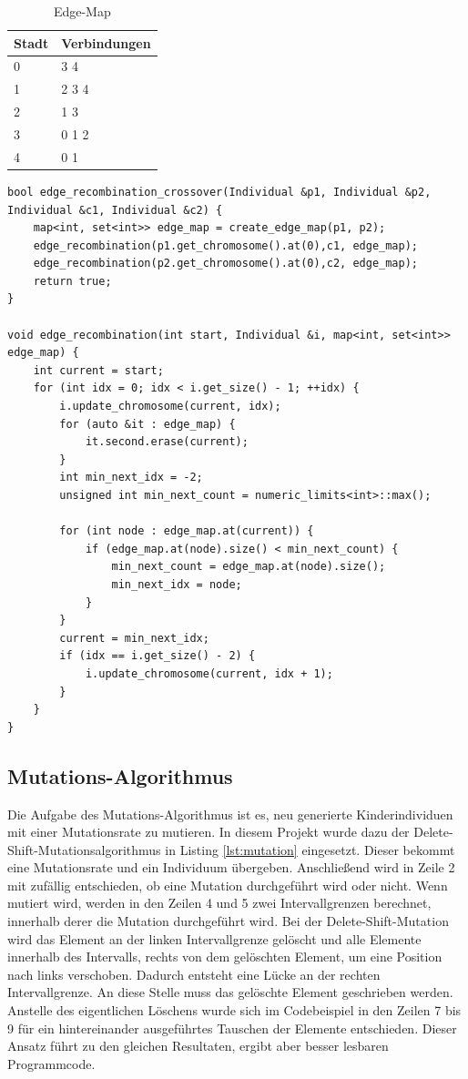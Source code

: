 \begin{table}[!htb]
\center
\caption{Edge-Map}
\begin{tabular}{l|l}
Stadt & Verbindungen \\
\hline
0 & 3 4\\
1 & 2 3 4\\
2 & 1 3\\
3 & 0 1 2\\
4 & 0 1\\
\end{tabular}
\label{tab:em}
\end{table}

\begin{minipage}[!htb]{\linewidth}
\begin{lstlisting}[caption={Edge-Recombination-Crossover}, firstnumber=1, captionpos=b, label=lst:erx]
bool edge_recombination_crossover(Individual &p1, Individual &p2, Individual &c1, Individual &c2) {
	map<int, set<int>> edge_map = create_edge_map(p1, p2);
	edge_recombination(p1.get_chromosome().at(0),c1, edge_map);
	edge_recombination(p2.get_chromosome().at(0),c2, edge_map);
	return true;
}

void edge_recombination(int start, Individual &i, map<int, set<int>> edge_map) {
	int current = start;
	for (int idx = 0; idx < i.get_size() - 1; ++idx) {
		i.update_chromosome(current, idx);
		for (auto &it : edge_map) {
			it.second.erase(current);
		}
		int min_next_idx = -2;
		unsigned int min_next_count = numeric_limits<int>::max();

		for (int node : edge_map.at(current)) {
			if (edge_map.at(node).size() < min_next_count) {
				min_next_count = edge_map.at(node).size();
				min_next_idx = node;
			}
		}
		current = min_next_idx;
		if (idx == i.get_size() - 2) {
			i.update_chromosome(current, idx + 1);
		}
	}
}
\end{lstlisting}
\end{minipage}
\subsection{Mutations-Algorithmus}
Die Aufgabe des Mutations-Algorithmus ist es, neu generierte Kinderindividuen mit einer Mutationsrate zu mutieren.
In diesem Projekt wurde dazu der Delete-Shift-Mutationsalgorithmus \cite[S. 277]{schoeneburg} in Listing \ref{lst:mutation} eingesetzt. Dieser bekommt eine Mutationsrate und ein Individuum übergeben.
Anschließend wird in Zeile 2 mit zufällig entschieden, ob eine Mutation durchgeführt wird oder nicht. Wenn mutiert wird, werden in den Zeilen 4 und 5 zwei Intervallgrenzen berechnet, innerhalb derer die Mutation durchgeführt wird.
Bei der Delete-Shift-Mutation wird das Element an der linken Intervallgrenze gelöscht und alle Elemente innerhalb des Intervalls, rechts von dem gelöschten Element, um eine Position nach links verschoben. Dadurch entsteht eine Lücke an der rechten Intervallgrenze. An diese Stelle muss das gelöschte Element geschrieben werden. Anstelle des eigentlichen Löschens wurde sich im Codebeispiel in den Zeilen 7 bis 9 für ein hintereinander ausgeführtes Tauschen der Elemente entschieden. Dieser Ansatz führt zu den gleichen Resultaten, ergibt aber besser lesbaren Programmcode.

